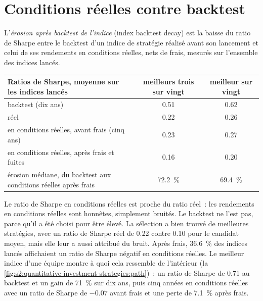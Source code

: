 \section{Conditions réelles contre backtest}

\begin{definition}\label{def:s2:quantitative-investment-strategies:decay}
L'\emph{érosion après backtest de l'indice} (index backtest decay) est la baisse du ratio de Sharpe entre le backtest d'un indice de stratégie réalisé avant son lancement et celui de ses
rendements en conditions réelles, nets de frais, mesurés sur l'ensemble des indices lancés.
\end{definition}

\begin{center}
\small
\setlength{\tabcolsep}{4pt}%
\begin{tabular}{@{}lcc@{}}
\toprule
Ratios de Sharpe, moyenne sur les indices lancés & meilleurs trois sur vingt & meilleur sur vingt\\
\midrule
backtest (dix ans) & 0.51 & 0.62\\
réel & 0.22 & 0.26\\
en conditions réelles, avant frais (cinq ans) & 0.23 & 0.27\\
en conditions réelles, après frais et fuites & 0.16 & 0.20\\
érosion médiane, du backtest aux conditions réelles après frais & 72.2~\% & 69.4~\%\\
\bottomrule
\end{tabular}
\end{center}

Le ratio de Sharpe en conditions réelles est proche du ratio réel~: les rendements en conditions réelles sont honnêtes, simplement bruités. Le backtest ne l'est pas, parce qu'il a été choisi pour être élevé. La sélection
a bien trouvé de meilleures stratégies, avec un ratio de Sharpe réel de 0.22 contre 0.10 pour le candidat moyen, mais elle leur a aussi attribué du bruit. Après
frais, 36.6~\% des indices lancés affichaient un ratio de Sharpe négatif en conditions réelles. Le meilleur indice d'une équipe montre à quoi cela ressemble de l'intérieur
(la \cref{fig:s2:quantitative-investment-strategies:path})~: un ratio de Sharpe de 0.71 au backtest et un gain de 71~\% sur dix ans, puis cinq années en conditions réelles avec un
ratio de Sharpe de $-0.07$ avant frais et une perte de 7.1~\% après frais.

